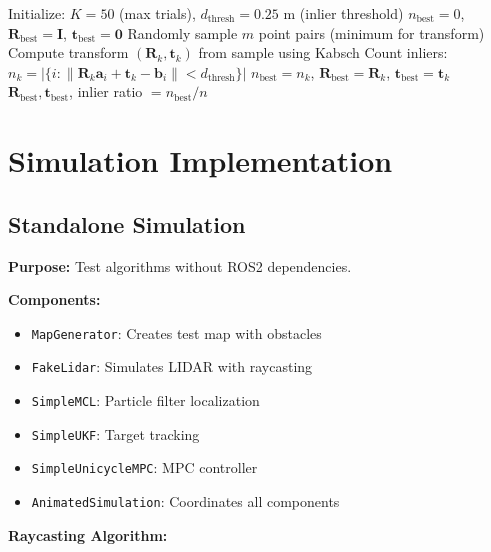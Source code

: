 \documentclass[11pt]{article}
\begin{document}
\begin{algorithm}[H]
\caption{RANSAC for Transform Estimation}
\begin{algorithmic}[1]
\State Initialize: $K = 50$ (max trials), $d_{\text{thresh}} = 0.25$ m (inlier threshold)
\State $n_{\text{best}} = 0$, $\mathbf{R}_{\text{best}} = \mathbf{I}$, $\mathbf{t}_{\text{best}} = \mathbf{0}$
    \State Randomly sample $m$ point pairs (minimum for transform)
    \State Compute transform $(\mathbf{R}_k, \mathbf{t}_k)$ from sample using Kabsch
    \State Count inliers: $n_k = |\{i : \|\mathbf{R}_k \mathbf{a}_i + \mathbf{t}_k - \mathbf{b}_i\| < d_{\text{thresh}}\}|$
        \State $n_{\text{best}} = n_k$, $\mathbf{R}_{\text{best}} = \mathbf{R}_k$, $\mathbf{t}_{\text{best}} = \mathbf{t}_k$
    \EndIf
\EndFor
\State \Return $\mathbf{R}_{\text{best}}, \mathbf{t}_{\text{best}}$, inlier ratio $= n_{\text{best}}/n$
\end{algorithmic}
\end{algorithm}

\section{Simulation Implementation}

\subsection{Standalone Simulation}

\textbf{Purpose:} Test algorithms without ROS2 dependencies.

\textbf{Components:}
\begin{itemize}
    \item \texttt{MapGenerator}: Creates test map with obstacles
    \item \texttt{FakeLidar}: Simulates LIDAR with raycasting
    \item \texttt{SimpleMCL}: Particle filter localization
    \item \texttt{SimpleUKF}: Target tracking
    \item \texttt{SimpleUnicycleMPC}: MPC controller
    \item \texttt{AnimatedSimulation}: Coordinates all components
\end{itemize}

\textbf{Raycasting Algorithm:}
\end{document}
